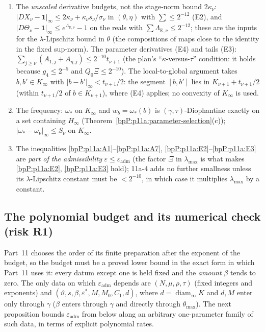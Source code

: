 \begin{enumerate}[label=(T\arabic*)]
\item The \emph{unscaled} derivative budgets, not the stage-norm bound $2\kappa_\nu$: $\lvert DX_\nu-\mathbf 1\rvert_\infty\le2\kappa_\nu+\kappa_\nu s_\nu/\sigma_\nu$ in $(\theta,\eta)$ with $\sum\le2^{-12}$ (E2), and $\lvert D\Theta_\nu-\mathbf 1\rvert_\infty\le e^{\Lambda_{\mathbb R,\nu}}-1$ on the reals with $\sum\Lambda_{\mathbb R,\nu}\le2^{-12}$; these are the inputs for the $\lambda$-Lipschitz bound in $\theta$ (the compositions of maps close to the identity in the fixed sup-norm). The parameter derivatives (E4) and tails (E3): $\sum_{j\ge\nu}(A_{1,j}+A_{\eta,j})\le2^{-10}t_{\nu+1}$ (the plan's ``$\kappa$-versus-$\tau$'' condition: it holds because $g_4\le2^{-5}$ and $Q_0\Xi\le2^{-10}$). The local-to-global argument takes $b,b'\in K_\infty$ with $\lvert b-b'\rvert_\infty<t_{\nu+1}/2$: the segment $[b,b']$ lies in $K_{\nu+1}+t_{\nu+1}/2$ (within $t_{\nu+1}/2$ of $b\in K_{\nu+1}$), where (E4) applies; no convexity of $K_\infty$ is used.
\item The frequency: $\omega_*$ on $K_\infty$ and $w_b=\omega_*(b)$ is $(\gamma,\tau)$-Diophantine exactly on a set containing $H_\infty$ (Theorem~\ref{bpP:p11a:parameter-selection}(c)); $\lvert\omega_*-\omega_\nu\rvert_\infty\le S_\nu$ on $K_\infty$.
\item The inequalities \ref{bpP:p11a:A1}--\ref{bpP:p11a:A7}, \ref{bpP:p11a:E2}--\ref{bpP:p11a:E3} are \emph{part of the admissibility} $\varepsilon\le\varepsilon_{\mathrm{adm}}$ (the factor $\Xi$ in $\lambda_{\max}$ is what makes \ref{bpP:p11a:E2}, \ref{bpP:p11a:E3} hold); 11a-4 adds no further smallness unless its $\lambda$-Lipschitz constant must be $<2^{-10}$, in which case it multiplies $\lambda_{\max}$ by a constant.
\end{enumerate}

\subsection{The polynomial budget and its numerical check (risk R1)}\label{bpP:p11a:sec-num}

Part~11 chooses the order of its finite preparation after the exponent of the budget, so the budget must be a proved lower bound in the exact form in which Part~11 uses it: every datum except one is held fixed and the \emph{amount} $\beta$ tends to zero. The only data on which $\varepsilon_{\mathrm{adm}}$ depends are $(N,\mu,\rho,\tau)$ (fixed integers and exponents) and $(\vartheta,s,\beta,\varepsilon^*,M,M_0,C_1,d)$, where $d=\operatorname{diam}_\infty K$ and $d,M$ enter only through $\gamma$ ($\beta$ enters through $\gamma$ and directly through $\theta_{\max}$). The next proposition bounds $\varepsilon_{\mathrm{adm}}$ from below along an arbitrary one-parameter family of such data, in terms of explicit polynomial rates.


